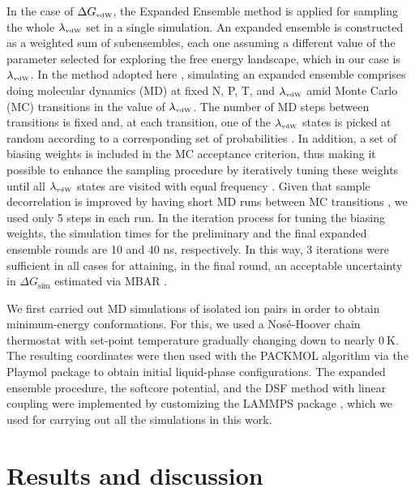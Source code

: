 \documentclass[3p,twocolumn]{elsarticle}
\begin{document}
In the case of $\Delta G_\text{\tiny vdW}$, the Expanded Ensemble method \cite{Lyubartsev_1992} is applied for sampling the whole $\lambda_\text{\tiny vdW}$ set in a single simulation.
An expanded ensemble is constructed as a weighted sum of subensembles, each one assuming a different value of the parameter selected for exploring the free energy landscape, which in our case is $\lambda_\text{\tiny vdW}$.
In the method adopted here \cite{Chodera_2011_2}, simulating an expanded ensemble comprises doing molecular dynamics (MD) at fixed N, P, T, and $\lambda_\text{\tiny vdW}$ amid Monte Carlo (MC) transitions in the value of $\lambda_\text{\tiny vdW}$.
The number of MD steps between transitions is fixed and, at each transition, one of the $\lambda_\text{\tiny vdW}$ states is picked at random according to a corresponding set of probabilities \cite{Chodera_2011_2}.
In addition, a set of biasing weights is included in the MC acceptance criterion, thus making it possible to enhance the sampling procedure by iteratively tuning these weights until all $\lambda_\text{\tiny vdW}$ states are visited with equal frequency \cite{Lyubartsev_1992}.
Given that sample decorrelation is improved by having short MD runs between MC transitions \cite{Chodera_2011_2}, we used only 5 steps in each run.
In the iteration process for tuning the biasing weights, the simulation times for the preliminary and the final expanded ensemble rounds are 10 and 40 ns, respectively.
In this way, 3 iterations were sufficient in all cases for attaining, in the final round, an acceptable uncertainty in $\Delta G_\text{sim}$ estimated via MBAR \cite{Shirts_2008, Klimovich_2015}.

We first carried out MD simulations of isolated ion pairs in order to obtain minimum-energy conformations.
For this, we used a Nos\'{e}-Hoover chain thermostat \cite{Martyna1992} with set-point temperature gradually changing down to nearly $0~\text{K}$.
The resulting coordinates were then used with the PACKMOL algorithm \cite{Mart_nez_2009} via the Playmol package \cite{playmol} to obtain initial liquid-phase configurations.
The expanded ensemble procedure, the softcore potential, and the DSF method  with linear coupling were implemented by customizing the LAMMPS package \cite{Plimpton1995}, which we used for carrying out all the simulations in this work.

\section{Results and discussion}
\label{sec:results}
\end{document}

